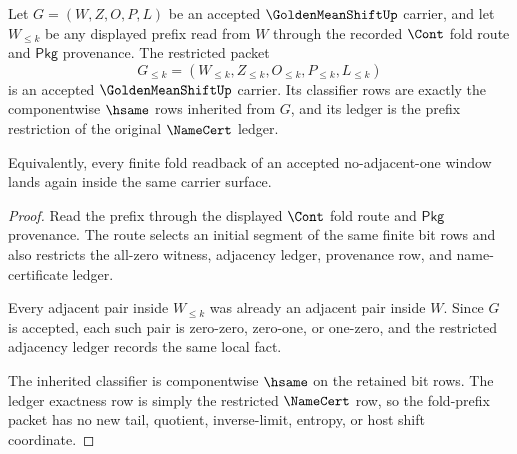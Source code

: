 \begin{theorem}
\label{thm:golden-mean-shift-fold-prefix-closure}
Let $G=(W,Z,O,P,L)$ be an accepted $\GoldenMeanShiftUp$ carrier, and let $W_{\leq k}$ be any displayed prefix read from $W$ through the recorded $\Cont$ fold route and $\mathsf{Pkg}$ provenance. The restricted packet
$$
G_{\leq k}=(W_{\leq k},Z_{\leq k},O_{\leq k},P_{\leq k},L_{\leq k})
$$
is an accepted $\GoldenMeanShiftUp$ carrier. Its classifier rows are exactly the componentwise $\hsame$ rows inherited from $G$, and its ledger is the prefix restriction of the original $\NameCert$ ledger.

Equivalently, every finite fold readback of an accepted no-adjacent-one window lands again inside the same carrier surface.
\end{theorem}
\begin{proof}
Read the prefix through the displayed $\Cont$ fold route and $\mathsf{Pkg}$ provenance. The route selects an initial segment of the same finite bit rows and also restricts the all-zero witness, adjacency ledger, provenance row, and name-certificate ledger.

Every adjacent pair inside $W_{\leq k}$ was already an adjacent pair inside $W$. Since $G$ is accepted, each such pair is zero-zero, zero-one, or one-zero, and the restricted adjacency ledger records the same local fact.

The inherited classifier is componentwise $\hsame$ on the retained bit rows. The ledger exactness row is simply the restricted $\NameCert$ row, so the fold-prefix packet has no new tail, quotient, inverse-limit, entropy, or host shift coordinate.
\end{proof}

